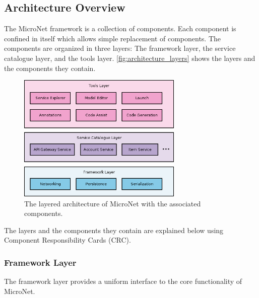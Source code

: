 \subsection{Architecture Overview}

The MicroNet framework is a collection of components. Each component is
confined in itself which allows simple replacement of components. The components
are organized in three layers: The framework layer, the service catalogue layer,
and the tools layer. \autoref{fig:architecture_layers} shows the layers and the
components they contain.

\begin{figure}
  \centering
  \includegraphics[width=0.7\textwidth]{images/architecture/ArchitectureLayers}
  \caption{The layered architecture of MicroNet with the associated components.}
  \label{fig:architecture_layers}
\end{figure}


The layers and the components they contain are explained below using Component
Responsibility Cards (CRC).

\newpage
\subsubsection{Framework Layer}

The framework layer provides a uniform interface to the core functionality of
MicroNet.\\

